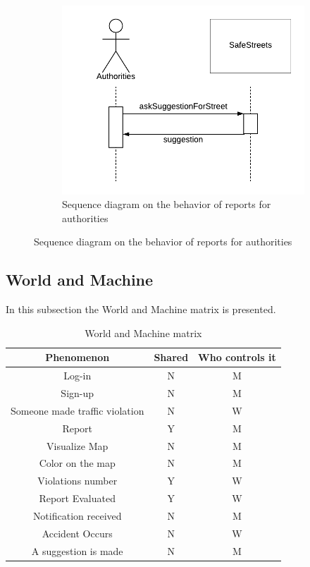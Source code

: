 \documentclass[12pt,a4paper]{report}
\begin{document}
			\begin{figure}[H]
				\begin{subfigure}{\textwidth}
					\includegraphics[scale = 0.75, center]{SuggestionSequenceDiagram}
					\caption{Sequence diagram on the behavior of reports for authorities}
				\end{subfigure}
			\end{figure}

	\subsection{World and Machine}
		In this subsection the World and Machine matrix is presented.
		\begin{table}[H]
			\centering
			\begin{tabular}{|c|c|c|}
				\hline
				Phenomenon & Shared & Who controls it\\
				\hline
				\hline
				Log-in & N & M\\
				\hline
				Sign-up & N & M\\
				\hline
				Someone made traffic violation & N & W\\
				\hline
				Report & Y & M\\
				\hline
				Visualize Map & N & M\\
				\hline
				Color on the map & N & M\\
				\hline
				Violations number & Y & W\\
				\hline
				Report Evaluated & Y & W\\
				\hline
				Notification received & N & M\\
				\hline
				Accident Occurs & N & W\\
				\hline
				A suggestion is made & N & M\\
				\hline
				
				
			\end{tabular}
			\caption{World and Machine matrix}
			\label{tab: }
		\end{table}
	
\end{document}
